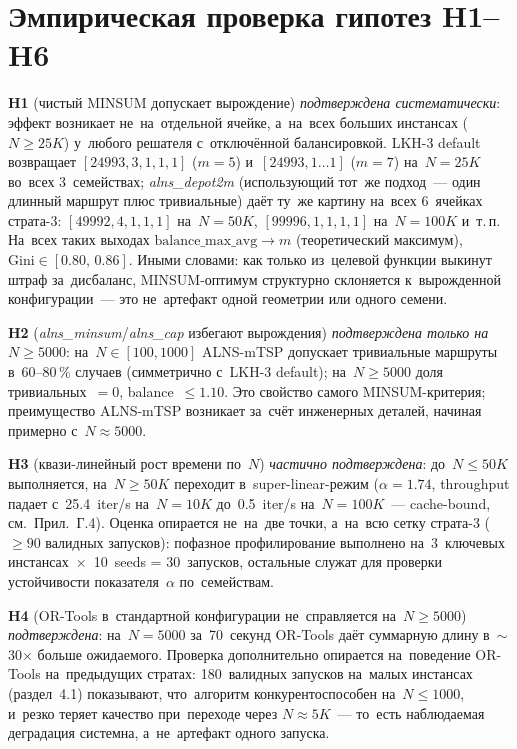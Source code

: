 \documentclass[a4paper,14pt]{extreport}
\begin{document}
\section{Эмпирическая проверка гипотез H1--H6}

\textbf{H1} (чистый MINSUM допускает вырождение) \emph{подтверждена систематически}: эффект возникает не~на~отдельной ячейке, а~на~всех больших инстансах ($N\geq 25K$) у~любого решателя с~отключённой балансировкой. LKH-3 default возвращает $[24993,3,1,1,1]$ ($m=5$) и~$[24993,1\dots 1]$ ($m=7$) на~$N=25K$ во~всех 3~семействах; \emph{alns\_depot2m} (использующий тот~же подход~--- один длинный маршрут плюс тривиальные) даёт ту~же картину на~всех 6~ячейках страта-3: $[49992,4,1,1,1]$ на~$N=50K$, $[99996,1,1,1,1]$ на~$N=100K$ и~т.\,п. На~всех таких выходах $\mathrm{balance\_max\_avg}\to m$ (теоретический максимум), $\mathrm{Gini}\in[0.80,\,0.86]$. Иными словами: как только из~целевой функции выкинут штраф за~дисбаланс, MINSUM-оптимум структурно склоняется к~вырожденной конфигурации~--- это не~артефакт одной геометрии или одного семени.

\textbf{H2} (\emph{alns\_minsum}/\emph{alns\_cap} избегают вырождения) \emph{подтверждена только на~$N\geq 5000$}: на~$N\in[100,1000]$ ALNS-mTSP допускает тривиальные маршруты в~60--80\,\% случаев (симметрично с~LKH-3 default); на~$N\geq 5000$ доля тривиальных~$=0$, balance~$\leq 1.10$. Это свойство самого MINSUM-критерия; преимущество ALNS-mTSP возникает за~счёт инженерных деталей, начиная примерно с~$N\approx 5000$.

\textbf{H3} (квази-линейный рост времени по~$N$) \emph{частично подтверждена}: до~$N\leq 50K$ выполняется, на~$N\geq 50K$ переходит в~super-linear-режим ($\alpha=1.74$, throughput падает с~25.4~iter/s на~$N=10K$ до~0.5~iter/s на~$N=100K$~--- cache-bound, см.~Прил.~Г.4). Оценка опирается не~на~две точки, а~на~всю сетку страта-3 ($\geq 90$ валидных запусков): пофазное профилирование выполнено на~3~ключевых инстансах~$\times$~10~seeds = 30~запусков, остальные служат для проверки устойчивости показателя~$\alpha$ по~семействам.

\textbf{H4} (OR-Tools в~стандартной конфигурации не~справляется на~$N\geq 5000$) \emph{подтверждена}: на~$N=5000$ за~70~секунд OR-Tools даёт суммарную длину в~$\sim$30$\times$ больше ожидаемого. Проверка дополнительно опирается на~поведение OR-Tools на~предыдущих стратах: 180~валидных запусков на~малых инстансах (раздел~4.1) показывают, что~алгоритм конкурентоспособен на~$N\leq 1000$, и~резко теряет качество при~переходе через $N\approx 5K$~--- то~есть наблюдаемая деградация системна, а~не~артефакт одного запуска.
\end{document}
